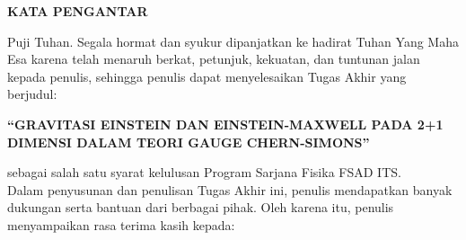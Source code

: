 \begin{center}
	\large{\textbf{KATA PENGANTAR}}
\end{center}
\indent Puji Tuhan. Segala hormat dan syukur dipanjatkan ke hadirat Tuhan Yang Maha Esa karena telah menaruh berkat, petunjuk, kekuatan, dan tuntunan jalan kepada penulis, sehingga penulis dapat menyelesaikan Tugas Akhir yang berjudul:
\begin{center}
	\textbf{``GRAVITASI EINSTEIN DAN EINSTEIN-MAXWELL PADA 2+1 DIMENSI DALAM TEORI GAUGE CHERN-SIMONS''}
\end{center}
sebagai salah satu syarat kelulusan Program Sarjana Fisika FSAD ITS.\\
\indent Dalam penyusunan dan penulisan Tugas Akhir ini, penulis mendapatkan banyak dukungan serta bantuan dari berbagai pihak. Oleh karena itu, penulis menyampaikan rasa terima kasih kepada:
